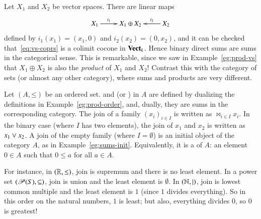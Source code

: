 \begin{example}
Let $X_1$ and $X_2$ be vector%
%
%
spaces.  There are linear maps
%
\begin{equation}        
\label{eq:vs-coprs}
\begin{array}{c}
\xymatrix{
X_1 \ar[r]^-{i_1} &X_1 \oplus X_2        &X_2 \ar[l]_-{i_2}
}
\end{array}
\end{equation}
% 
defined by $i_1(x_1) = (x_1, 0)$ and $i_2(x_2) = (0, x_2)$, and it can be
checked that~\eqref{eq:vs-coprs} is a colimit cocone in $\mathbf{Vect}_k$.  Hence
binary direct%
%
%
sums are sums in the categorical sense.  This is remarkable,
since we saw in Example~\ref{eg:prod-vs} that $X_1 \oplus X_2$ is also the
\emph{product} of $X_1$ and $X_2$!  Contrast this with the category of sets
(or almost any other category), where sums and products are very different.
\end{example}

\begin{example}
Let $(A, \mathord{\leq})$ be an ordered set.%
%
%
 and  (or )%
%
%
in $A$ are defined by dualizing the definitions in
Example~\ref{eg:prod-order}, and, dually, they are sums in the corresponding
category.  The join of a family $(x_i)_{i \in I}$ is written as $\Join_{\! i
\in I} x_i$.%
%
%
In the binary case (where $I$ has two elements), the join of $x_1$ and
$x_2$ is written as $x_1 \vee x_2$.%
%
%
A join of the empty family (where $I = \emptyset$) is an initial
object of the category $A$, as in Example~\ref{eg:sums-init}.
Equivalently, it is a  of $A$: an element $0 \in A$ such that $0 \leq a$ for all $a \in
A$.

For instance, in $(\mathbb{R}, \mathord{\leq})$, join is supremum%
%
%
and there is no least element.  In a power%
%
%
set $(\operatorname{\mathscr{P}}(S), \subseteq)$, join is union%
%
%
and the least element is $\emptyset$.  In $(\mathbb{N}, \mathbin{\mid})$, join is
lowest%
%
%
common multiple and the least element is $1$ (since $1$ divides
everything).  So in this order on the natural numbers, $1$ is least; but
also, everything divides $0$, so $0$ is greatest!
\end{example}


